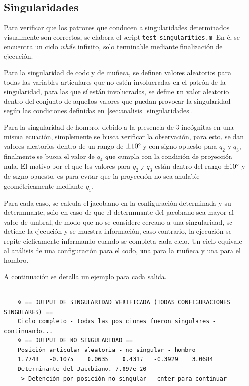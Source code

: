 \documentclass{article}
\begin{document}
\begin{appendices}
\subsection{Singularidades}
\label{ap:SINGULARIDADES}

Para verificar que los patrones que conducen a singularidades determinados visualmente son correctos, se elabora el script \colorbox{gray!20}{\texttt{test\_singularities.m}}. En él se encuentra un ciclo \textit{while} infinito, solo terminable mediante finalización de ejecución. 

Para la singularidad de codo y de muñeca, se definen valores aleatorios para todas las variables articulares que no estén involucradas en el patrón de la singularidad, para las que sí están involucradas, se define un valor aleatorio dentro del conjunto de aquellos valores que puedan provocar la singularidad según las condiciones definidas en~\ref{sec:analisis_singularidades}.


Para la singularidad de hombro, debido a la presencia de 3 incógnitas en una misma ecuación, simplemente se busca verificar la observación, para esto, se dan valores aleatorios dentro de un rango de $\pm10\degree$ y con signo opuesto para $q_2$ y $q_3$, finalmente se busca el valor de $q_4$ que cumpla con la condición de proyección nula. El motivo por el que los valores para $q_2$ y $q_3$ están dentro del rango $\pm10\degree$ y de signo opuesto, es para evitar que la proyección no sea anulable geométricamente mediante $q_4$.


Para cada caso, se calcula el jacobiano en la configuración determinada y su determinante, solo en caso de que el determinante del jacobiano sea mayor al valor de umbral, de modo que no se considere cercano a una singularidad, se detiene la ejecución y se muestra información, caso contrario, la ejecución se repite cíclicamente informando cuando se completa cada ciclo. Un ciclo equivale al análisis de una configuración para el codo, una para la muñeca y una para el hombro.

A continuación se detalla un ejemplo para cada salida.

\begin{lstlisting}[style=Matlab-editor, basicstyle=\small\ttfamily]

    % == OUTPUT DE SINGULARIDAD VERIFICADA (TODAS CONFIGURACIONES SINGULARES) ==
    Ciclo completo - todas las posiciones fueron singulares - continuando...
    % == OUTPUT DE NO SINGULARIDAD ==
    Posición articular aleatoria - no singular - hombro
    1.7748   -0.1075    0.0635    0.4317   -0.3929    3.0684
    Determinante del Jacobiano: 7.897e-20
    -> Detención por posición no singular - enter para continuar


\end{lstlisting}
\end{appendices}
\end{document}
